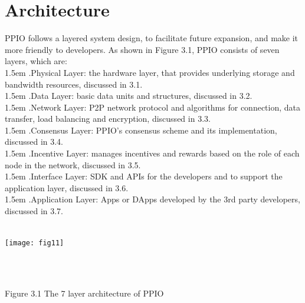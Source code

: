 \documentclass[10pt,a4paper]{article}
\begin{document}
    \section{Architecture} %
PPIO follows a layered system design, to facilitate future expansion, and make it more friendly to developers. As shown in Figure 3.1, PPIO consists of seven layers, which are:
\vspace{-0.5em}
 \\


\hangindent 1.5em
.\quad  Physical Layer: the hardware layer, that provides underlying storage and bandwidth resources, discussed in 3.1.
\vspace{-0.8em}
\\


\hangindent 1.5em
.\quad Data Layer: basic data units and structures, discussed in 3.2.
\vspace{-0.8em}
\\


\hangindent 1.5em
.\quad Network Layer: P2P network protocol and algorithms for connection, data transfer, load balancing and encryption, discussed in 3.3.
\vspace{-0.8em}
\\

\hangindent 1.5em
.\quad Consensus Layer: PPIO’s consensus scheme and its implementation, discussed in 3.4.
\vspace{-0.8em}
\\

\hangindent 1.5em
.\quad Incentive Layer: manages incentives and rewards based on the role of each node in the network, discussed in 3.5.
\vspace{-0.8em}
\\

\hangindent 1.5em
.\quad Interface Layer: SDK and APIs for the developers and to support the application layer, discussed in 3.6.
\vspace{-0.8em}
\\

\hangindent 1.5em
.\quad Application Layer: Apps or DApps developed by the 3rd party developers, discussed in 3.7.
\vspace{-0.3em}
 \\ \\
\centerline{\texttt{[image: fig11]}}
\vspace{-1.5em}
\\\\
 \centerline{{Figure 3.1 The 7 layer architecture of PPIO}}
\vspace{-1.5em}
\end{document}
